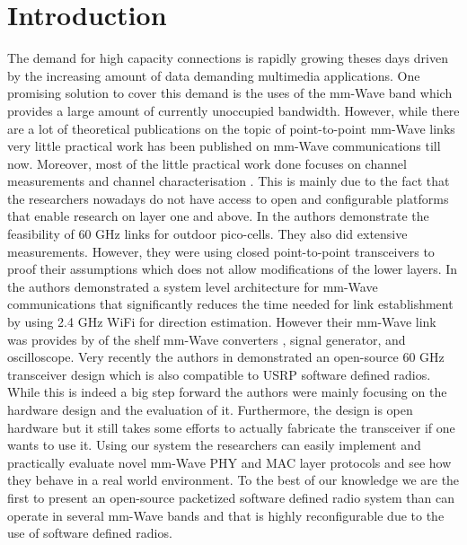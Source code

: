 \documentclass{acm_proc_article-sp}
\begin{document}



\section{Introduction}
The demand for high capacity connections is rapidly growing theses days driven by the increasing amount of data demanding multimedia applications. 
One promising solution to cover this demand is the uses of the mm-Wave band which provides a large amount of currently unoccupied bandwidth.
However, while there are a lot of theoretical publications on the topic of point-to-point mm-Wave links very little practical work has been published on mm-Wave communications till now.
Moreover, most of the little practical work done focuses on channel measurements and channel characterisation \cite{Rappaport01} \cite{Weiler01}.
This is mainly due to the fact that the researchers nowadays do not have access to open and configurable platforms that enable research on layer one and above. 
In \cite{Zhu14} the authors demonstrate the feasibility of 60 GHz links for outdoor pico-cells. They also did extensive measurements. However, they were using closed point-to-point transceivers \cite{hxi} to proof their assumptions which does not allow modifications of the lower layers.
In \cite{Nitsche01} the authors demonstrated a system level architecture for mm-Wave communications that significantly reduces the time needed for link establishment by using 2.4 GHz WiFi for direction estimation. However their mm-Wave link was provides by of the shelf mm-Wave converters \cite{vubiqnetworks}, signal generator, and oscilloscope.
Very recently the authors in \cite{Zetterberg15} demonstrated an open-source 60 GHz transceiver design which is also compatible to USRP software defined radios. While this is indeed a big step forward the authors were mainly focusing on the hardware design and the evaluation of it. Furthermore, the design is open hardware but it still takes some efforts to actually fabricate the transceiver if one wants to use it.
Using our system the researchers can easily implement and practically evaluate novel mm-Wave PHY and MAC layer protocols and see how they behave in a real world environment.
To the best of our knowledge we are the first to present an open-source packetized software defined radio system than can operate in several mm-Wave bands and that is highly reconfigurable due to the use of software defined radios.
\end{document}
